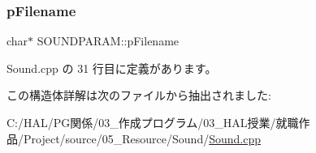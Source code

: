 \subsubsection{\texorpdfstring{p\+Filename}{pFilename}}
{\footnotesize\ttfamily char$\ast$ S\+O\+U\+N\+D\+P\+A\+R\+A\+M\+::p\+Filename}



 Sound.\+cpp の 31 行目に定義があります。



この構造体詳解は次のファイルから抽出されました\+:\begin{DoxyCompactItemize}
\item 
C\+:/\+H\+A\+L/\+P\+G関係/03\+\_\+作成プログラム/03\+\_\+\+H\+A\+L授業/就職作品/\+Project/source/05\+\_\+\+Resource/\+Sound/\mbox{\hyperlink{_sound_8cpp}{Sound.\+cpp}}\end{DoxyCompactItemize}
